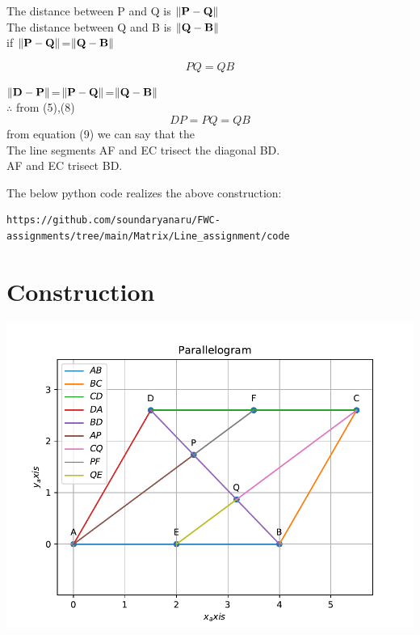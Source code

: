 \documentclass[10pt, a4paper]{article}
\let\vec\mathbf
\begin{document}
	\begin{center}
	The distance between P and Q is $\norm{\vec{P}-\vec{Q}}$\\
	The distance between Q and B is $\norm{\vec{Q}-\vec{B}}$\\
	if $\norm{\vec{P}-\vec{Q}}$=$\norm{\vec{Q}-\vec{B}}$\\
	\end{center}
	\begin{equation}
	PQ=QB
	\end{equation}
	\begin{center}
	$\norm{\vec{D}-\vec{P}}$=$\norm{\vec{P}-\vec{Q}}$=$\norm{\vec{Q}-\vec{B}}$\\
$\therefore$ from (5),(8) \\
\begin{equation}
DP=PQ=QB
\end{equation}	
		from equation (9) we can say that the \\	
	 The line segments AF and EC trisect the diagonal BD.\\
	 AF and EC trisect BD.
	\end{center}
The below python code realizes the above construction:	\\
\begin{lstlisting}
https://github.com/soundaryanaru/FWC-assignments/tree/main/Matrix/Line_assignment/code
\end{lstlisting}
 
\section{Construction}
\includegraphics[scale=0.7]{line_1.pdf}
 	

\end{document}

